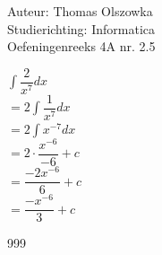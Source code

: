 \documentclass[a4paper]{article}
\newcommand{\dint}{\displaystyle\int}
\begin{document}
\noindent \large Auteur: Thomas Olszowka \\
\noindent \large Studierichting: Informatica \\
\noindent \large Oefeningenreeks 4A nr. 2.5  \\



\medskip

\normalsize

$\dint \dfrac{2}{x^7} dx$ \\

$= 2 \dint \dfrac{1}{x^7} dx$ \\

$= 2 \dint x^{-7} dx$ \\

$= 2 \cdot \dfrac{x^{-6}}{-6} +c$ \\

$= \dfrac{-2x^{-6}}{6} + c$ \\

$= \dfrac{-x^{-6}}{3} + c$ \\

\begin{thebibliography}{999}
\end{thebibliography}
\end{document}
